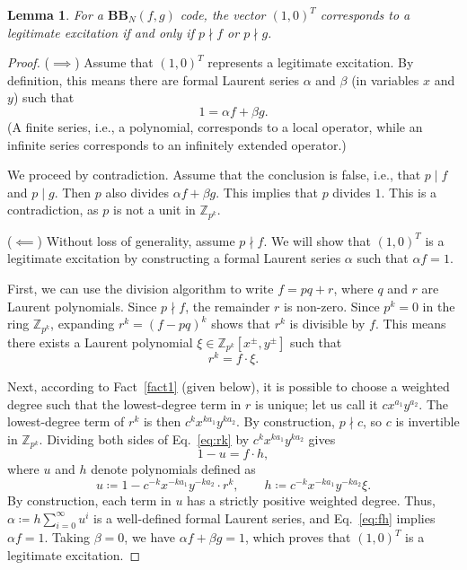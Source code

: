 \documentclass[10pt,a4paper]{amsart}
\newtheorem{lem}{Lemma}
\begin{document}
\begin{lem}
    For a $\mathbf{BB}_N(f,g)$ code, the vector $(1,0)^T$ corresponds to a legitimate excitation if and only if $p\nmid f$ or $p\nmid g$.\label{lem:local_operator_can_be_created}
\end{lem}

\begin{proof}
($\implies$) Assume that $\left(1,0\right)^{T}$ represents a legitimate
excitation. By definition, this means there are formal Laurent series $\alpha$ and $\beta$ (in variables $x$ and $y$) such that
\begin{equation}
1=\alpha f+\beta g.
\end{equation}
(A finite series, i.e., a polynomial, corresponds to a local operator, while an infinite series corresponds to an infinitely extended operator.) 

We proceed by contradiction. Assume that the conclusion is false, i.e.,
that $p\mid f$ and $p\mid g$. Then $p$  also divides $\alpha f+\beta g$.
This implies that $p$ divides $1$. This is a contradiction, as $p$ is not a unit in $\mathbb{Z}_{p^k}$.

($\impliedby$) Without loss of generality, assume $p\nmid f$. We
will show that $\left(1,0\right)^{T}$ is a legitimate excitation
by constructing a formal Laurent series $\alpha$ such that $\alpha f=1$.

First, we can use the division algorithm to write $f=pq+r$, where
$q$ and $r$ are Laurent polynomials. Since $p\nmid f$, the remainder
$r$ is non-zero. Since $p^{k}=0$ in the ring $\mathbb{Z}_{p^{k}}$,
expanding $r^{k}=\left(f-pq\right)^{k}$ shows that $r^{k}$ is divisible
by $f$. This means there exists a Laurent polynomial $\xi\in\mathbb{Z}_{p^{k}}\left[x^{\pm},y^{\pm}\right]$
such that 
\begin{equation}
r^{k}=f\cdot\xi.\label{eq:rk}
\end{equation}

Next, according to Fact~\ref{fact1} (given below), it is possible to choose a weighted
degree such that the lowest-degree term in $r$ is unique; let us
call it $cx^{a_{1}}y^{a_{2}}$. The lowest-degree term of $r^{k}$
is then $c^{k}x^{ka_{1}}y^{ka_{2}}$. By construction, $p\nmid c$,
so $c$ is invertible in $\mathbb{Z}_{p^{k}}$. 
Dividing both sides of Eq.~\eqref{eq:rk} by $c^{k}x^{ka_{1}}y^{ka_{2}}$ gives
\begin{equation}
1-u=f\cdot h, \label{eq:fh}
\end{equation}
where $u$ and $h$ denote polynomials defined as
\begin{equation}
u\coloneqq1-c^{-k}x^{-ka_{1}}y^{-ka_{2}}\cdot r^{k},\qquad h\coloneqq c^{-k}x^{-ka_{1}}y^{-ka_{2}}\xi.
\end{equation}
By construction, each term in $u$ has a strictly positive weighted
degree. Thus, 
$
\alpha\coloneqq h\sum_{i=0}^{\infty}u^{i}    
$
is a well-defined formal Laurent series, and Eq.~\eqref{eq:fh} implies $\alpha f=1$. Taking $\beta=0$, we have $\alpha f+\beta g=1$, which proves that $\left(1,0\right)^{T}$
is a legitimate excitation.
\end{proof}
\end{document}
